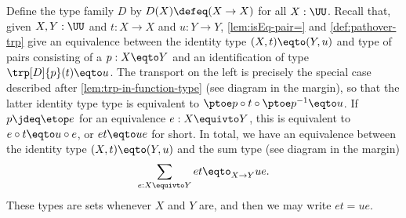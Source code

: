 Define the type family $D$ by $D(X) \defeq (X\to X)$ for all $X:\UU$.
Recall that, given $X,Y:\UU$ and $t:X\to X$ and $u:Y\to Y$,
\cref{lem:isEq-pair=} and \cref{def:pathover-trp} give
an equivalence between the identity type $(X,t)\eqto (Y,u)$ and
type of pairs consisting of a $p:X\eqto Y$ and an identification
of type $\trp[D]{p}(t)\eqto u$. The transport on the left is precisely
the special case described after \cref{lem:trp-in-function-type}
(see diagram in the margin),
so that the latter identity type
type is equivalent to $\ptoe p\circ t\circ \ptoe p^{-1} \eqto u$.
If $p\jdeq\etop e$ for an equivalence $e:X\equivto Y$,
this is equivalent to $e\circ t \eqto u\circ e$, or $e t \eqto u e$ for short.
In total, we have an equivalence between the identity type
$(X,t)\eqto(Y,u)$ and the sum type (see diagram in the margin)%
\[
  \sum_{e: X\equivto Y} et \eqto_{X\to Y} ue.
\]
These types are sets whenever $X$ and $Y$ are, and then we
may write $et = ue$.
